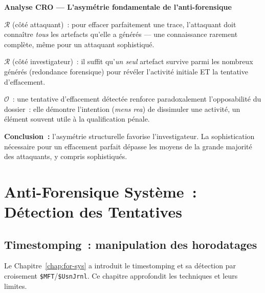 \begin{boxCRO}
\textbf{Analyse CRO --- L'asymétrie fondamentale de l'anti-forensique}

$\mathcal{R}$ (côté attaquant)~: pour effacer parfaitement une trace,
l'attaquant doit connaître \emph{tous} les artefacts qu'elle a générés
--- une connaissance rarement complète, même pour un attaquant
sophistiqué.

$\mathcal{R}$ (côté investigateur)~: il suffit qu'\emph{un seul}
artefact survive parmi les nombreux générés (redondance forensique)
pour révéler l'activité initiale ET la tentative d'effacement.

$\mathcal{O}$~: une tentative d'effacement détectée renforce
paradoxalement l'opposabilité du dossier~: elle démontre l'intention
(\textit{mens rea}) de dissimuler une activité, un élément
souvent utile à la qualification pénale.


\textbf{Conclusion~:} l'asymétrie structurelle favorise l'investigateur.
La sophistication nécessaire pour un effacement parfait dépasse les
moyens de la grande majorité des attaquants, y compris sophistiqués.
\end{boxCRO}

\section{Anti-Forensique Système~: Détection des Tentatives}
\label{sec:anti-for-systeme}

\subsection{Timestomping~: manipulation des horodatages}

Le Chapitre~\ref{chap:for-sys} a introduit le timestomping et sa
détection par croisement \texttt{\$MFT}/\texttt{\$UsnJrnl}. Ce chapitre
approfondit les techniques et leurs limites.

